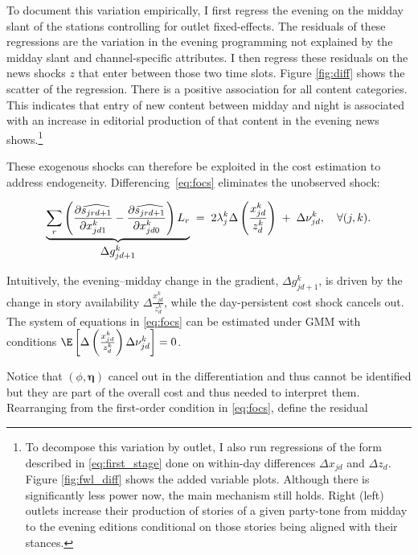 \documentclass[12pt]{article}
\begin{document}
To document this variation empirically, I first regress the evening on the midday slant of the stations controlling for outlet fixed-effects. The residuals of these regressions are the  variation in the evening programming not explained by the midday slant and channel-specific attributes. I then regress these residuals on the news shocks $z$ that enter between those two time slots. Figure \ref{fig:diff} shows the scatter of the regression.  There is a positive association for all content categories. This indicates that entry of new content between midday and night is associated with an increase in editorial production of that content in the evening news shows.\footnote{To decompose this variation by outlet, I also run regressions of the form described in  \eqref{eq:first_stage} done on within-day differences $ \Delta x_{jd}$ and $\Delta z_{d}$. Figure \ref{fig:fwl_diff}  shows the added variable plots. Although there is significantly less power now, the main mechanism still holds. Right (left) outlets increase  their production of stories of a given party-tone from midday to the evening editions conditional on those stories being aligned with their stances. 
} 


These exogenous shocks can therefore be exploited in the cost estimation to address endogeneity. Differencing~\eqref{eq:focs} eliminates the unobserved shock:

\begin{equation}\label{eq:diff_foc}
	\underbrace{%
		\sum_{r}\left(
		\frac{\partial \widehat{s_{jrd+1}}}{\partial x_{jd1}^k}
		-
		\frac{\partial \widehat{s_{jrd+1}}}{\partial x_{jd0}^k}
		\right)L_r
	}_{\textstyle \Delta g_{jd+1}^k}
	\;=\;
	2\lambda_j^k
\Delta	
\left( \frac{x_{jd}^k }{z_{d}^k } \right)
	\;+\;
	\Delta\nu_{jd}^k,
	\quad \forall (j,k).
\end{equation}



 Intuitively, the evening–midday change in the gradient, $\Delta g_{jd+1}^k$, is driven by the change in story availability $\Delta	
\frac{x_{jd}^k }{z_{d}^k }$, while the day-persistent cost shock cancels out. The system of equations in \eqref{eq:focs} can be estimated under GMM with conditions $\E \left[\Delta  \left( \frac{x_{jd}^k}{z_{d}^k} \right)  \Delta\nu_{jd}^k \right]= 0 $. 




Notice that $\left(\phi,\bm\eta \right)$ cancel out in the differentiation and thus cannot be identified but they are part of the overall cost and thus needed to interpret them. Rearranging from the   first-order condition in \eqref{eq:focs}, define the residual
\end{document}
